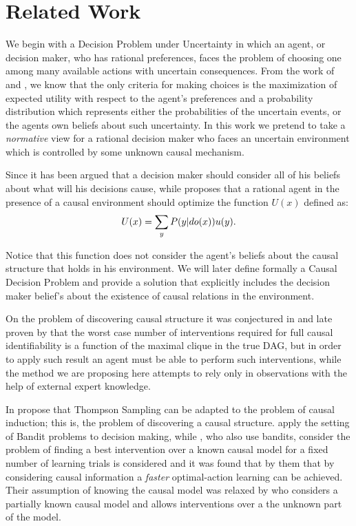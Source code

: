 \documentclass[letterpaper]{article}
\begin{document}
\section{Related Work}
We begin with a Decision Problem under Uncertainty in which an agent, or decision maker, who has rational preferences, faces the problem of choosing one among many available actions with uncertain consequences. From the work of \cite{von1944theory} and \cite{savage1954the}, we know that the only criteria for making choices is the maximization of expected utility with respect to the agent's preferences and a probability distribution which represents either the probabilities of the uncertain events, or the agents own beliefs about such uncertainty. In this work we pretend to take a \textit{normative} view for a rational decision maker who faces an uncertain environment which is controlled by some unknown causal mechanism.

Since \cite{joyce1999foundations} it has been argued that a decision maker should consider all of his beliefs about what will his decisions cause, while \cite{pearl2009causality} proposes that a rational agent in the presence of a causal environment should optimize the function $U(x)$ defined as: 
\begin{equation}{\label{pearl}} 
U(x)=\sum_y P(y | do(x)) u(y).
\end{equation}

Notice that this function does not consider the agent's beliefs about the causal structure that holds in his environment. We will later define formally a Causal Decision Problem and provide a solution that explicitly includes the decision maker belief's about the existence of causal relations in the environment.

On the problem of discovering causal structure it was conjectured in \cite{eberhardt2005number} \cite{eberhardt2008almost} and late proven by \cite{hauser2012two} that the worst case number of interventions required for full causal identifiability is a function of the maximal clique in the true DAG, but in order to apply such result an agent must be able to perform such interventions, while the method we are proposing here attempts to rely only in observations with the help of external expert knowledge. 

In \cite{ortega2014generalized} propose that Thompson Sampling can be adapted to the problem of causal induction; this is, the problem of discovering a causal structure. \cite{bareinboim2015bandits} apply the setting of Bandit problems to decision making, while \cite{lattimoreNIPS2016}, who also use bandits, consider the problem of finding a best intervention over a known causal model for a fixed number of learning trials is considered and it was found that by them that by considering causal information a \textit{faster} optimal-action learning can be achieved. Their assumption of knowing the causal model was relaxed by \cite{sen2017identifying} who considers a partially known causal model and allows interventions over a the unknown part of the model. 
\end{document}
